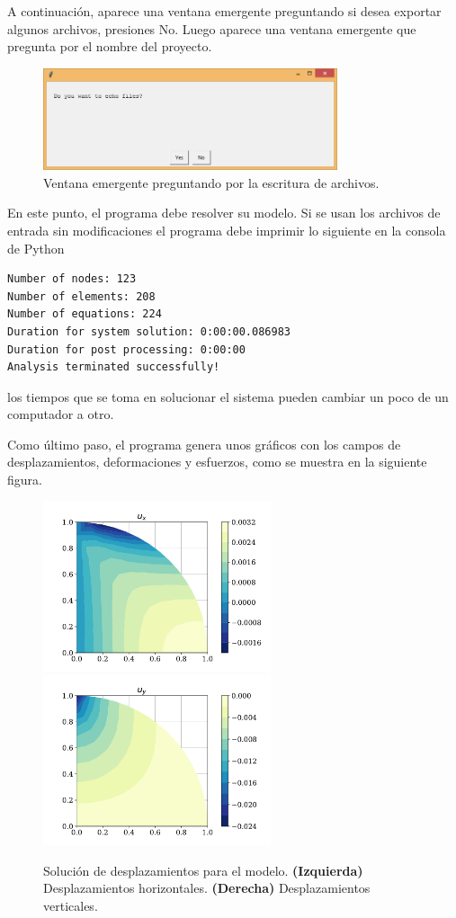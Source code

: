 \documentclass[12pt,letterpaper]{article}
\begin{document}
A continuación, aparece una ventana emergente preguntando si desea exportar algunos archivos, presiones No.
Luego aparece una ventana emergente que pregunta por el nombre del proyecto.
\begin{figure}[H]
    \centering
    \includegraphics[height=3cm]{img/solids_ISO-echo.png} 
    \caption{Ventana emergente preguntando por la escritura de archivos.}
\end{figure}

En este punto, el programa debe resolver su modelo. Si se usan los archivos de entrada sin modificaciones el programa debe imprimir lo siguiente en la consola de Python
\begin{verbatim}
Number of nodes: 123
Number of elements: 208
Number of equations: 224
Duration for system solution: 0:00:00.086983
Duration for post processing: 0:00:00
Analysis terminated successfully!
\end{verbatim}
los tiempos que se toma en solucionar el sistema pueden cambiar un poco de un computador a otro.

Como último paso, el programa genera unos gráficos con los campos de desplazamientos, deformaciones y esfuerzos, como se muestra en la siguiente figura.
\begin{figure}[H]
    \centering
    \includegraphics[height=5cm]{img/Prueba_brasilera_ux.pdf} 
    \includegraphics[height=5cm]{img/Prueba_brasilera_uy.pdf}
    \caption{Solución de desplazamientos para el modelo. \textbf{(Izquierda)} Desplazamientos horizontales.
    \textbf{(Derecha)} Desplazamientos verticales.}
\end{figure}
\end{document}
